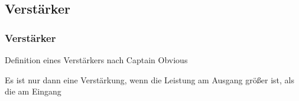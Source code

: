 
\subsection*{Verstärker}
\begin{frame}
  \frametitle{Verstärker}
  \begin{block}{Definition eines Verstärkers nach Captain Obvious}
    \begin{Large}
      Es ist nur dann eine Verstärkung, wenn die Leistung am Ausgang größer ist, als die am Eingang
    \end{Large}
  \end{block}
\end{frame}

